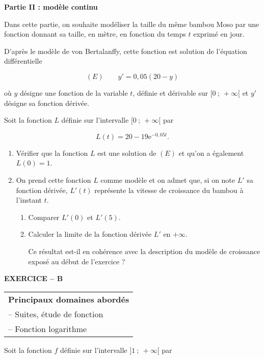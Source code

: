 \documentclass[11pt]{article}
\newcommand{\e}{\text{e}}
\begin{document}
\bigskip

\textbf{Partie II : modèle continu}

\medskip

Dans cette partie, on souhaite modéliser la taille du même bambou Moso par une fonction donnant sa taille, en mètre, en fonction du temps $t$ exprimé en jour. 

D'après le modèle de von Bertalanffy, cette fonction est solution de l'équation différentielle

\[(E) \qquad y' = 0,05(20 - y)\]

où $y$ désigne une fonction de la variable $t$, définie et dérivable sur $[0~;~+\infty[$ et $y'$ désigne sa fonction dérivée.

Soit la fonction $L$ définie sur l'intervalle $[0~;~+\infty[$ par 

\[L(t) = 20 - 19\e^{-0,05t}.\]

\smallskip

\begin{enumerate}
\item Vérifier que la fonction $L$ est une solution de $(E)$ et qu'on a également $L(0) = 1$.
\item On prend cette fonction $L$ comme modèle et on admet que, si on note $L'$ sa fonction dérivée,
$L'(t)$ représente la vitesse de croissance du bambou à l'instant $t$.
	\begin{enumerate}
		\item Comparer $L'(0)$ et $L'(5)$.
		\item Calculer la limite de la fonction dérivée $L'$ en $+\infty$. 
		
Ce résultat est-il en cohérence avec la description du modèle de croissance exposé au début de l'exercice ?
	\end{enumerate}
\end{enumerate}

\bigskip

\textbf{EXERCICE -- B}

\medskip

\begin{tabular}{|l|}\hline
\textbf{Principaux domaines abordés}\\
-- Suites, étude de fonction\\
-- Fonction logarithme\\ \hline
\end{tabular}

\medskip

Soit la fonction $f$ définie sur l'intervalle $]1~;~ +\infty[$ par 
\end{document}
